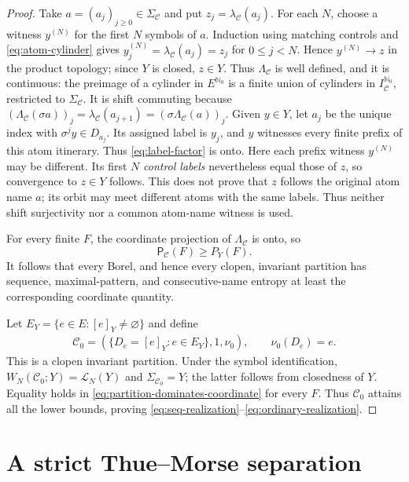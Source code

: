 \documentclass[11pt,reqno]{amsart}
\numberwithin{equation}{section}
\theoremstyle{definition}
\newcommand{\Nzero}{\mathbb N_0}
\newcommand{\C}{\mathcal C}
\newcommand{\Lcal}{\mathcal L}
\newcommand{\Patt}{\mathsf P}
\begin{document}
\begin{proof}
Take $a=(a_j)_{j\ge0}\in\Sigma_\C$ and put $z_j=\lambda_\C(a_j)$.  For each
$N$, choose a witness $y^{(N)}$ for the first $N$ symbols of $a$.  Induction
using matching controls and \eqref{eq:atom-cylinder} gives
$y^{(N)}_j=\lambda_\C(a_j)=z_j$ for $0\le j<N$.  Hence
$y^{(N)}\to z$ in the product topology; since $Y$ is closed, $z\in Y$.  Thus
$\Lambda_\C$ is well defined, and it is continuous: the preimage of a cylinder in $E^{\Nzero}$ is a finite
union of cylinders in $I_\C^{\Nzero}$, restricted to $\Sigma_\C$.
It is shift commuting because
$(\Lambda_\C(\sigma a))_j=\lambda_\C(a_{j+1})
=(\sigma\Lambda_\C(a))_j$.  Given $y\in Y$, let $a_j$ be the unique index with
$\sigma^j y\in D_{a_j}$.  Its assigned label is $y_j$, and $y$ witnesses
every finite prefix of this atom itinerary.  Thus \eqref{eq:label-factor} is onto.  Here each prefix witness $y^{(N)}$ may be different. Its first $N$
\emph{control labels} nevertheless equal those of $z$, so convergence to
$z\in Y$ follows. This does not prove that $z$ follows the original atom
name $a$; its orbit may meet different atoms with the same labels.
Thus neither shift surjectivity nor a common atom-name witness is used.

For every finite $F$, the coordinate projection of $\Lambda_\C$ is onto, so
\begin{equation}\label{eq:partition-dominates-coordinate}
 \Patt_\C(F)\ge P_Y(F).
\end{equation}
It follows that every Borel, and hence every clopen, invariant partition has
sequence, maximal-pattern, and consecutive-name entropy at least the
corresponding coordinate quantity.

Let $E_Y=\{e\in E:[e]_Y\ne\varnothing\}$ and define
\begin{align*}
\C_0=(\{D_e=[e]_Y:e\in E_Y\},1,\nu_0),
 \qquad \nu_0(D_e)=e.
\end{align*}
This is a clopen invariant partition.  Under the symbol identification,
$W_N(\C_0;Y)=\Lcal_N(Y)$ and $\Sigma_{\C_0}=Y$; the latter follows from
closedness of $Y$.  Equality holds in \eqref{eq:partition-dominates-coordinate}
for every $F$.  Thus $\C_0$ attains all the lower bounds, proving
\eqref{eq:seq-realization}--\eqref{eq:ordinary-realization}.
\end{proof}


\section{A strict Thue--Morse separation}\label{sec:thue-morse}
\end{document}
